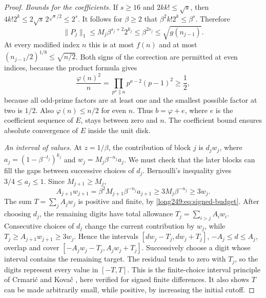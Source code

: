 \documentclass[11pt]{article}
\theoremstyle{plain}
\theoremstyle{definition}
\theoremstyle{remark}
\begin{document}
\begin{proof}
\emph{Bounds for the coefficients.} If $s\ge16$ and $2kk!\le\sqrt s$, then
$4k!2^k\le2\sqrt s\,2^{\sqrt s/2}\le2^s$. It follows for $\beta\ge2$
that $\beta^2k!2^k\le\beta^s$. Therefore
\begin{equation}\label{long249:eq:signed-budget}
 \|P_j\|_1\le M_j\beta^{s_j+2}2^{k_j}
 \le\beta^{2s_j}\le\sqrt{g(n_{j-1})}.
\end{equation}
At every modified index $n$ this is at most $f(n)$ and at most
$(n_{j-1}/2)^{1/8}\le\sqrt{n/2}$. Both signs of the correction are permitted at even indices, because
the product formula gives
\[
 \frac{\varphi(n)^2}{n}
 =\prod_{p^a\parallel n}p^{a-2}(p-1)^2\ge\frac12,
\]
because all odd-prime factors are at least one and the smallest possible
factor at two is $1/2$. Also $\varphi(n)\le n/2$ for even $n$.
Thus $b=\varphi+e$, where $e$ is the coefficient sequence of $E$, stays
between zero and $n$. The coefficient bound ensures absolute convergence
of $E$ inside the unit disk.

\emph{An interval of values.} At $z=1/\beta$, the contribution of
block $j$ is $d_jw_j$, where
$a_j=(1-\beta^{-t_j})^{k_j}$ and $w_j=M_j\beta^{-n_j}a_j$.
We must check that the later blocks can fill the gaps between
successive choices of $d_j$.
Bernoulli's inequality gives $3/4\le a_j\le1$. Since $M_{j+1}\ge M_j$,
\[
 A_{j+1}w_{j+1}=\beta^2M_{j+1}\beta^{-n_j}a_{j+1}
 \ge3M_j\beta^{-n_j}\ge3w_j.
\]
The sum $T=\sum_j A_jw_j$ is positive and finite, by
\eqref{long249:eq:signed-budget}. After choosing $d_j$, the remaining
digits have total allowance $T_j=\sum_{i>j}A_iw_i$. Consecutive choices
of $d_j$ change the current contribution by $w_j$, while
$T_j\ge A_{j+1}w_{j+1}\ge3w_j$. Hence the intervals
$[dw_j-T_j,dw_j+T_j]$, $-A_j\le d\le A_j$, overlap and cover
$[-A_jw_j-T_j,A_jw_j+T_j]$. Successively choose a digit whose interval
contains the remaining target. The residual tends to zero with $T_j$,
so the digits represent every value in $[-T,T]$. This is the
finite-choice interval principle of Crmari\'{c} and Kova\v{c}
\cite[Lemma~4(a), Remark~5]{crmarickovac2025signed}, here verified for
signed finite differences. It also shows $T$ can be made arbitrarily
small, while positive, by increasing the initial cutoff.


\end{proof}
\end{document}

